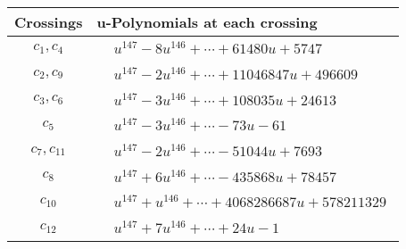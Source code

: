 \documentclass[1p]{elsarticle_modified}
\theoremstyle{definition}
\begin{document}
\begin{tabular}{m{50pt}|m{274pt}}
Crossings & \hspace{64pt}u-Polynomials at each crossing \\
\hline $$\begin{aligned}c_{1},c_{4}\end{aligned}$$&$\begin{aligned}
&u^{147}-8 u^{146}+\cdots+61480 u+5747
\end{aligned}$\\
\hline $$\begin{aligned}c_{2},c_{9}\end{aligned}$$&$\begin{aligned}
&u^{147}-2 u^{146}+\cdots+11046847 u+496609
\end{aligned}$\\
\hline $$\begin{aligned}c_{3},c_{6}\end{aligned}$$&$\begin{aligned}
&u^{147}-3 u^{146}+\cdots+108035 u+24613
\end{aligned}$\\
\hline $$\begin{aligned}c_{5}\end{aligned}$$&$\begin{aligned}
&u^{147}-3 u^{146}+\cdots-73 u-61
\end{aligned}$\\
\hline $$\begin{aligned}c_{7},c_{11}\end{aligned}$$&$\begin{aligned}
&u^{147}-2 u^{146}+\cdots-51044 u+7693
\end{aligned}$\\
\hline $$\begin{aligned}c_{8}\end{aligned}$$&$\begin{aligned}
&u^{147}+6 u^{146}+\cdots-435868 u+78457
\end{aligned}$\\
\hline $$\begin{aligned}c_{10}\end{aligned}$$&$\begin{aligned}
&u^{147}+u^{146}+\cdots+4068286687 u+578211329
\end{aligned}$\\
\hline $$\begin{aligned}c_{12}\end{aligned}$$&$\begin{aligned}
&u^{147}+7 u^{146}+\cdots+24 u-1
\end{aligned}$\\
\hline
\end{tabular}\\~\\
\end{document}
